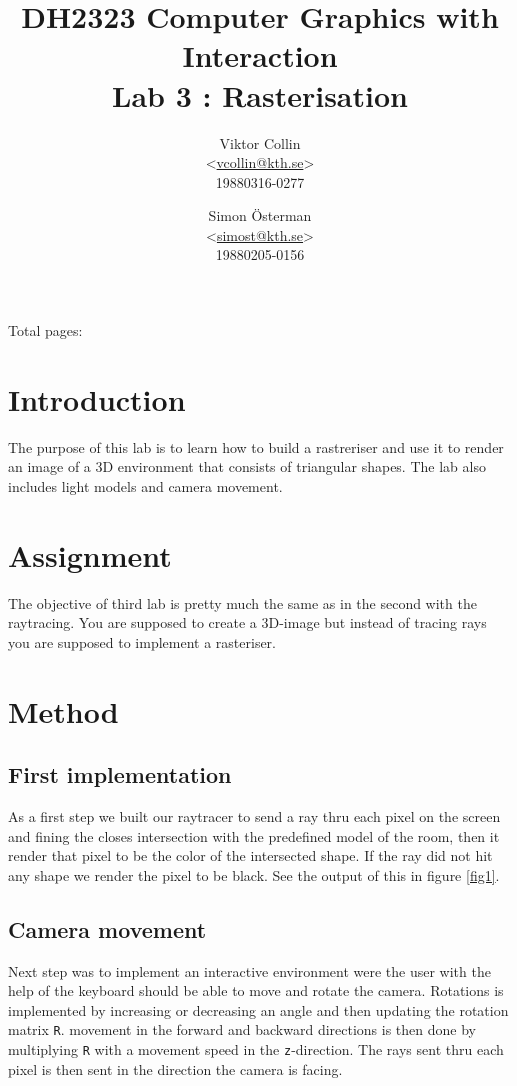 \documentclass[a4paper,11pt]{article}
\author{Viktor Collin \\ <\url{vcollin@kth.se}> \\ 19880316-0277 \and Simon \"{O}sterman \\ <\url{simost@kth.se}> \\ 19880205-0156}
\title{\textbf{DH2323 Computer Graphics with Interaction \\ Lab 3 : Rasterisation}}
\begin{document}
\maketitle
\begin{center}
Total pages: \pageref{LastPage}
\end{center}
\thispagestyle{empty}

\clearpage
\setcounter{page}{1}
\section{Introduction}
The purpose of this lab is to learn how to build a rastreriser and use it to render an image of a 3D environment that consists of triangular shapes. The lab also includes light models and camera movement. 
\section{Assignment}
The objective of third lab is pretty much the same as in the second with the raytracing. You are supposed to create a 3D-image but instead of tracing rays you are supposed to implement a rasteriser.
\section{Method}
\subsection{First implementation}
As a first step we built our raytracer to send a ray thru each pixel on the screen and fining the closes intersection with the predefined model of the room, then it render that pixel to be the color of the intersected shape. If the ray did not hit any shape we  render the pixel to be black. See the output of this in figure \ref{fig1}.

\subsection{Camera movement}
Next step was to implement an interactive environment were the user with the help of the keyboard should be able to move and rotate the camera. Rotations is implemented by increasing or decreasing an angle and then updating the rotation matrix \verb|R|. movement in the forward and backward directions is then done by multiplying \verb|R| with a movement speed in the \verb|z|-direction. The rays sent thru each pixel is then sent in the direction the camera is facing.
\end{document}
